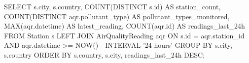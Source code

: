 SELECT 
    s.city,
    s.country,
    COUNT(DISTINCT s.id) AS station_count,
    COUNT(DISTINCT aqr.pollutant_type) AS pollutant_types_monitored,
    MAX(aqr.datetime) AS latest_reading,
    COUNT(aqr.id) AS readings_last_24h
FROM Station s
LEFT JOIN AirQualityReading aqr ON s.id = aqr.station_id 
    AND aqr.datetime >= NOW() - INTERVAL '24 hours'
GROUP BY s.city, s.country
ORDER BY s.country, s.city, readings_last_24h DESC;